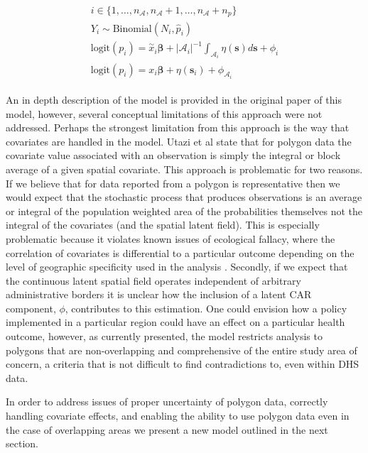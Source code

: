 \documentclass{article}
\begin{document}
\begin{align}\label{utaziModel}\begin{split}
    i \in \{1, \dots, n_{\mathcal{A}}, n_{\mathcal{A}} + 1, \dots, n_{\mathcal{A}} + n_p\}\\
    Y_i \sim \text{Binomial}(N_i, \hat{p}_i) \\
    \text{logit}(p_i) = \overset{\sim}{x}_i \boldsymbol{\beta} + |\mathcal{A}_i|^{-1} \int_{\mathcal{A}_i} \eta(\boldsymbol{s}) d\boldsymbol{s} + \phi_i \\
    \text{logit}(p_i) = x_i \boldsymbol{\beta} + \eta(\boldsymbol{s}_i) + \phi_{\mathcal{A}_i}
\end{split}\end{align}

An in depth description of the model is provided in the original paper of this model, however, several conceptual limitations of this approach were not addressed. Perhaps the strongest limitation from this approach is the way that covariates are handled in the model. Utazi et al state that for polygon data the covariate value associated with an observation is simply the integral or block average of a given spatial covariate. This approach is problematic for two reasons. If we believe that for data reported from a polygon is representative then we would expect that the stochastic process that produces observations is an average or integral of the population weighted area of the probabilities themselves not the integral of the covariates (and the spatial latent field). This is especially problematic because it violates known issues of ecological fallacy, where the correlation of covariates is differential to a particular outcome depending on the level of geographic specificity used in the analysis \cite{Dark2007, Openshaw1984}. Secondly, if we expect that the continuous latent spatial field operates independent of arbitrary administrative borders it is unclear how the inclusion of a latent CAR component, $\phi$, contributes to this estimation. One could envision how a policy implemented in a particular region could have an effect on a particular health outcome, however, as currently presented, the model restricts analysis to polygons that are non-overlapping and comprehensive of the entire study area of concern, a criteria that is not difficult to find contradictions to, even within DHS data. 

In order to address issues of proper uncertainty of polygon data, correctly handling covariate effects, and enabling the ability to use polygon data even in the case of overlapping areas we present a new model outlined in the next section.
\end{document}
